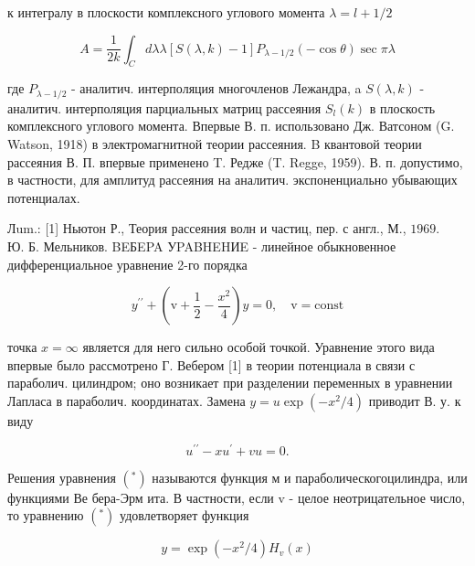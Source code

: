 \documentclass[10pt]{article}
\begin{document}
к интегралу в плоскости комплексного углового момента $\lambda=l+1 / 2$



\[

A=\frac{1}{2 k} \int_{C} d \lambda \lambda[S(\lambda, k)-1] P_{\lambda-1 / 2}(-\cos \theta) \sec \pi \lambda

\]



где $P_{\lambda-1 / 2}$ - аналитич. интерполяция многочленов Лежандра, a $S(\lambda, k)$ - аналитич. интерполяция парциальных матриц рассеяния $S_{l}(k)$ в плоскость комплексного углового момента. Впервые В. п. использовано Дж. Ватсоном (G. Watson, 1918) в электромагнитной теории рассеяния. B квантовой теории рассеяния В. П. впервые применено T. Редже (T. Regge, 1959). В. п. допустимо, в частности, для амплитуд рассеяния на аналитич. экспоненциально убывающих потенциалах.



Лum.: [1] Ньютон Р., Теория рассеяния волн и частиц, пер. с англ., М., $1969 . \quad$ Ю. Б. Мельников. BEБEPA УPABHEHИE - линейное обыкновенное дифференциальное уравнение 2-го порядка



\[

y^{\prime \prime}+\left(\mathrm{v}+\frac{1}{2}-\frac{x^{2}}{4}\right) y=0, \quad \mathrm{v}=\mathrm{const}

\]



точка $x=\infty$ является для него сильно особой точкой. Уравнение этого вида впервые было рассмотрено Г. Вебером [1] в теории потенциала в связи с параболич. цилиндром; оно возникает при разделении переменных в уравнении Лапласа в параболич. координатах. Замена $y=u \exp \left(-x^{2} / 4\right)$ приводит В. у. к виду



\[

u^{\prime \prime}-x u^{\prime}+v u=0 .

\]



Решения уравнения $\left(^{*}\right)$ называются функция м и параболическогоцилиндра, или функциями Ве бера-Эрм ита. В частности, если v - целое неотрицательное число, то уравнению $\left({ }^{*}\right)$ удовлетворяет функция



\[

y=\exp \left(-x^{2} / 4\right) H_{v}(x)

\]
\end{document}
